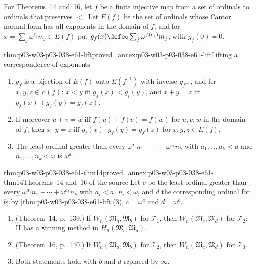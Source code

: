 For Theorems~14 and~16, let \(f\) be a finite injective map from a set of
ordinals to ordinals that preserves \(<\). Let \(E(f)\) be the set of
ordinals whose Cantor normal form has all exponents in the domain of
\(f\), and for \(x=\sum_j\omega^{e_j}m_j\in E(f)\) put
\(g_f(x)\defeq\sum_j\omega^{f(e_j)}m_j\), with \(g_f(0)=0\).

\begin{hblemma}{thm:p03-w03-p03-038-e61-lift}{proved=annex:p03-w03-p03-038-e61-lift}{Lifting a correspondence of exponents}
\begin{enumerate}
\item \(g_f\) is a bijection of \(E(f)\) onto \(E(f^{-1})\) with inverse
      \(g_{f^{-1}}\), and for \(x,y,z\in E(f)\): \(x<y\) iff
      \(g_f(x)<g_f(y)\), and \(x+y=z\) iff \(g_f(x)+g_f(y)=g_f(z)\).
\item If moreover \(u+v=w\) iff \(f(u)+f(v)=f(w)\) for \(u,v,w\) in the
      domain of \(f\), then \(x\cdot y=z\) iff
      \(g_f(x)\cdot g_f(y)=g_f(z)\) for \(x,y,z\in E(f)\).
\item The least ordinal greater than every
      \(\omega^{a_1}n_1+\cdots+\omega^{a_k}n_k\) with \(a_1,\ldots,a_k<a\)
      and \(n_1,\ldots,n_k<\omega\) is \(\omega^a\).
\end{enumerate}
\end{hblemma}

\begin{hbtheorem}{thm:p03-w03-p03-038-e61-thm14}{proved=annex:p03-w03-p03-038-e61-thm14}{Theorems~14 and~16 of the source}
Let \(c\) be the least ordinal greater than every
\(\omega^{a_1}n_1+\cdots+\omega^{a_k}n_k\) with \(a_i<a\),
\(n_i<\omega\), and \(d\) the corresponding ordinal for \(b\); by
\cref{thm:p03-w03-p03-038-e61-lift}(3), \(c=\omega^a\) and
\(d=\omega^b\).
\begin{enumerate}
\item (Theorem~14, p.~139.) If \(W_n(\mathfrak M_a,\mathfrak M_b)\) for
      \(\mathcal T_1\), then \(W_n(\mathfrak M_c,\mathfrak M_d)\) for
      \(\mathcal T_2\): II has a winning method in
      \(H_n(\mathfrak M_c,\mathfrak M_d)\).
\item (Theorem~16, p.~140.) If \(W_n(\mathfrak M_a,\mathfrak M_b)\) for
      \(\mathcal T_2\), then \(W_n(\mathfrak M_c,\mathfrak M_d)\) for
      \(\mathcal T_3\).
\item Both statements hold with \(b\) and \(d\) replaced by \(\infty\).
\end{enumerate}
\end{hbtheorem}

